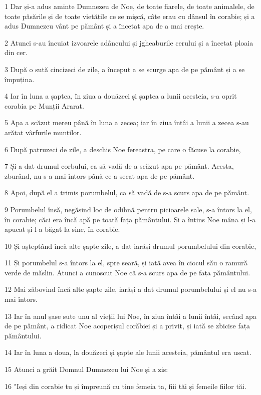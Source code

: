 \par 1 Dar și-a adus aminte Dumnezeu de Noe, de toate fiarele, de toate animalele, de toate păsările și de toate vietățile ce se mișcă, câte erau cu dânsul în corabie; și a adus Dumnezeu vânt pe pământ și a încetat apa de a mai crește.
\par 2 Atunci s-au încuiat izvoarele adâncului și jgheaburile cerului și a încetat ploaia din cer.
\par 3 După o sută cincizeci de zile, a început a se scurge apa de pe pământ și a se împuțina.
\par 4 Iar în luna a șaptea, în ziua a douăzeci și șaptea a lunii acesteia, s-a oprit corabia pe Munții Ararat.
\par 5 Apa a scăzut mereu până în luna a zecea; iar în ziua întâi a lunii a zecea s-au arătat vârfurile munților.
\par 6 După patruzeci de zile, a deschis Noe fereastra, pe care o făcuse la corabie,
\par 7 Și a dat drumul corbului, ca să vadă de a scăzut apa pe pământ. Acesta, zburând, nu s-a mai întors până ce a secat apa de pe pământ.
\par 8 Apoi, după el a trimis porumbelul, ca să vadă de s-a scurs apa de pe pământ.
\par 9 Porumbelul însă, negăsind loc de odihnă pentru picioarele sale, s-a întors la el, în corabie; căci era încă apă pe toată fața pământului. Și a întins Noe mâna și l-a apucat și l-a băgat la sine, în corabie.
\par 10 Și așteptând încă alte șapte zile, a dat iarăși drumul porumbelului din corabie,
\par 11 Și porumbelul s-a întors la el, spre seară, și iată avea în ciocul său o ramură verde de măslin. Atunci a cunoscut Noe că s-a scurs apa de pe fața pământului.
\par 12 Mai zăbovind încă alte șapte zile, iarăși a dat drumul porumbelului și el nu s-a mai întors.
\par 13 Iar în anul șase sute unu al vieții lui Noe, în ziua întâi a lunii întâi, secând apa de pe pământ, a ridicat Noe acoperișul corăbiei și a privit, și iată se zbicise fața pământului.
\par 14 Iar în luna a doua, la douăzeci și șapte ale lunii acesteia, pământul era uscat.
\par 15 Atunci a grăit Domnul Dumnezeu lui Noe și a zis:
\par 16 "Ieși din corabie tu și împreună cu tine femeia ta, fiii tăi și femeile fiilor tăi.
